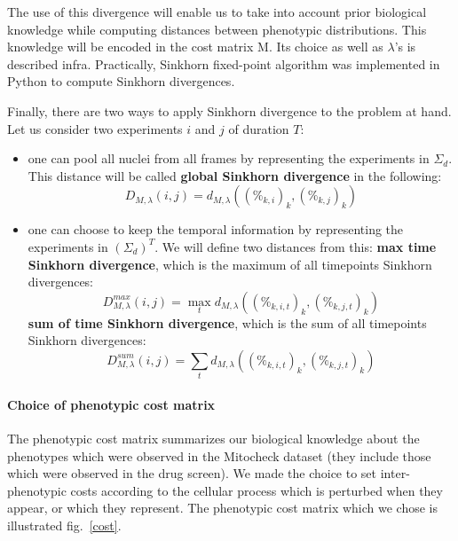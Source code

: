 The use of this divergence will enable us to take into account prior biological knowledge while computing distances between phenotypic distributions. This knowledge will be encoded in the cost matrix M. Its choice as well as $\lambda$'s is described infra. Practically, Sinkhorn fixed-point algorithm was implemented in Python to compute Sinkhorn divergences.

Finally, there are two ways to apply Sinkhorn divergence to the problem at hand. Let us consider two experiments $i$ and $j$ of duration $T$: 

\begin{itemize}
\item one can pool all nuclei from all frames by representing the experiments in $\Sigma_d$. This distance will be called \textbf{global Sinkhorn divergence} in the following:
\begin{equation}
D_{M,\lambda}(i,j)= d_{M,\lambda}((\%_{k,i})_{k},(\%_{k,j})_{k})
\label{global}
\end{equation}
\item one can choose to keep the temporal information by representing the experiments in $\left(\Sigma_d\right) ^T$. We will define two distances from this:
\subitem \textbf{max time Sinkhorn divergence}, which is the maximum of all timepoints Sinkhorn divergences:
\begin{equation}
D_{M,\lambda}^{max}(i,j)= \max_t d_{M,\lambda}((\%_{k,i,t})_{k},(\%_{k,j,t})_{k})
\label{max}
\end{equation}
\subitem \textbf{sum of time Sinkhorn divergence}, which is the sum of all timepoints Sinkhorn divergences: 
\begin{equation}
D_{M,\lambda}^{sum}(i,j)= \sum_t d_{M,\lambda}((\%_{k,i,t})_{k},(\%_{k,j,t})_{k})
\label{int}
\end{equation}
\end{itemize}

\paragraph{Choice of phenotypic cost matrix}
The phenotypic cost matrix summarizes our biological knowledge about the phenotypes which were observed in the Mitocheck dataset (they include those which were observed in the drug screen). We made the choice to set inter-phenotypic costs according to the cellular process which is perturbed when they appear, or which they represent. The phenotypic cost matrix which we chose is illustrated fig.~\ref{cost}.

